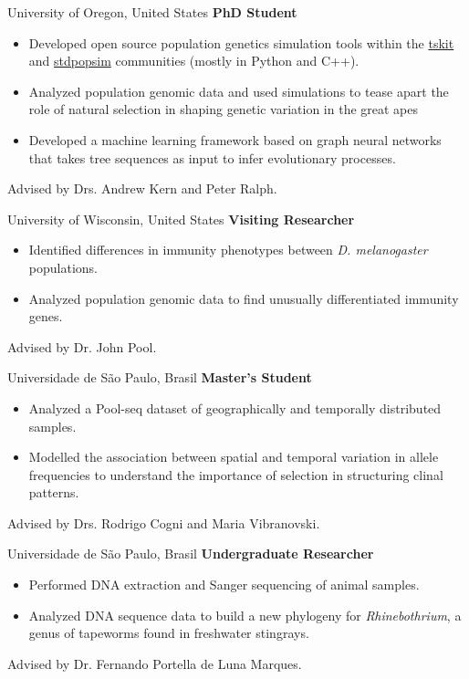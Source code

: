 	{%
		University of Oregon, United States
    }
	{%
		\textbf{PhD Student}
    }
	{%
        \begin{itemize}
            \item Developed open source population genetics simulation tools within the \href{https://tskit.dev/software/}{tskit} and \href{https://popsim-consortium.github.io/stdpopsim-docs/stable/index.html}{stdpopsim} communities (mostly in Python and C++). 
            \item Analyzed population genomic data and used simulations to tease apart the role of natural selection in shaping genetic variation in the great apes
            \item Developed a machine learning framework based on graph neural networks that takes tree sequences as input to infer evolutionary processes.
        \end{itemize}
        {\footnotesize Advised by Drs. Andrew Kern and Peter Ralph.}
    }

	{%
		University of Wisconsin, United States
    }
	{%
		\textbf{Visiting Researcher}
    }
	{%
        \begin{itemize}
            \item Identified differences in immunity phenotypes between \textit{D. melanogaster} populations.
            \item Analyzed population genomic data to find unusually differentiated immunity genes.
        \end{itemize}
        {\footnotesize Advised by Dr. John Pool.}
    }

	{%
		Universidade de São Paulo, Brasil
    }
	{%
		\textbf{Master's Student}
    }
	{%
        \begin{itemize}
            \item Analyzed a Pool-seq dataset of geographically  and temporally distributed samples.
            \item Modelled the association between spatial and temporal variation in allele frequencies to understand the importance of selection in structuring clinal patterns.
        \end{itemize}
        {\footnotesize Advised by Drs. Rodrigo Cogni and Maria Vibranovski.}
    }

	{%
		Universidade de São Paulo, Brasil
    }
	{%
		\textbf{Undergraduate Researcher}
    }
	{%
        \begin{itemize}
            \item Performed DNA extraction and Sanger sequencing of animal samples.
            \item Analyzed DNA sequence data to build a new phylogeny for \textit{Rhinebothrium}, a genus of tapeworms found in freshwater stingrays.
        \end{itemize}
        {\footnotesize Advised by Dr. Fernando Portella de Luna Marques.}
    }

